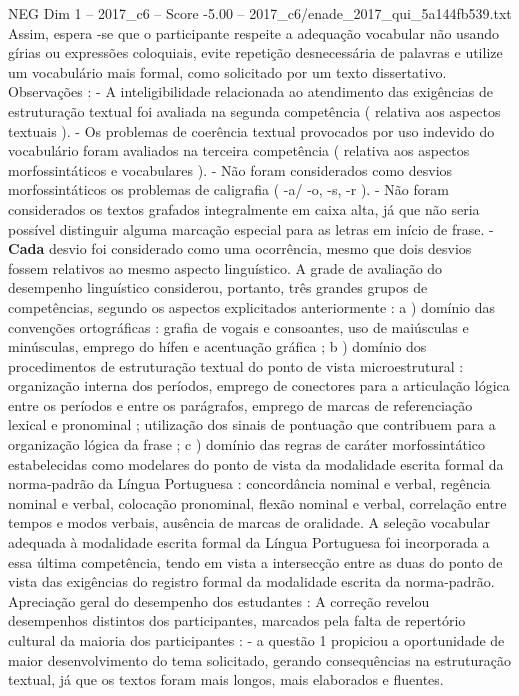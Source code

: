 \begin{textsample}{NEG Dim 1 – 2017\_c6 – Score -5.00 – 2017\_c6/enade\_2017\_qui\_5a144fb539.txt}
Assim, espera -se que o participante respeite a adequação vocabular não usando gírias ou expressões coloquiais, evite repetição desnecessária de palavras e utilize um vocabulário mais formal, como solicitado por um texto dissertativo.
Observações : - A inteligibilidade relacionada ao atendimento das exigências de estruturação textual foi avaliada na segunda competência ( relativa aos aspectos textuais ). - Os problemas de coerência textual provocados por uso indevido do vocabulário foram avaliados na terceira competência ( relativa aos aspectos morfossintáticos e vocabulares ). - Não foram considerados como desvios morfossintáticos os problemas de caligrafia ( -a/ -o, -s, -r ). - Não foram considerados os textos grafados integralmente em caixa alta, já que não seria possível distinguir alguma marcação especial para as letras em início de frase. - \textbf{Cada} desvio foi considerado como uma ocorrência, mesmo que dois desvios fossem relativos ao mesmo aspecto linguístico.
A grade de avaliação do desempenho linguístico considerou, portanto, três grandes grupos de competências, segundo os aspectos explicitados anteriormente : a ) domínio das convenções ortográficas : grafia de vogais e consoantes, uso de maiúsculas e minúsculas, emprego do hífen e acentuação gráfica ; b ) domínio dos procedimentos de estruturação textual do ponto de vista microestrutural : organização interna dos períodos, emprego de conectores para a articulação lógica entre os períodos e entre os parágrafos, emprego de marcas de referenciação lexical e pronominal ; utilização dos sinais de pontuação que contribuem para a organização lógica da frase ; c ) domínio das regras de caráter morfossintático estabelecidas como modelares do ponto de vista da modalidade escrita formal da norma-padrão da Língua Portuguesa : concordância nominal e verbal, regência nominal e verbal, colocação pronominal, flexão nominal e verbal, correlação entre tempos e modos verbais, ausência de marcas de oralidade.
A seleção vocabular adequada à modalidade escrita formal da Língua Portuguesa foi incorporada a essa última competência, tendo em vista a intersecção entre as duas do ponto de vista das exigências do registro formal da modalidade escrita da norma-padrão.
Apreciação geral do desempenho dos estudantes : A correção revelou desempenhos distintos dos participantes, marcados pela falta de repertório cultural da maioria dos participantes : - a questão 1 propiciou a oportunidade de maior desenvolvimento do tema solicitado, gerando consequências na estruturação textual, já que os textos foram mais longos, mais elaborados e fluentes.

\end{textsample}
